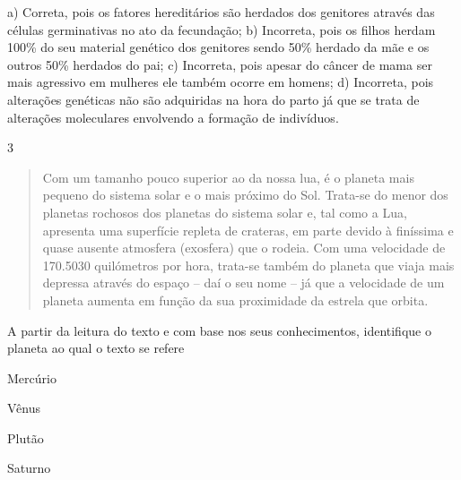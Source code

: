 {{{a)  Correta, pois os fatores hereditários são herdados dos genitores
  através das células germinativas no ato da fecundação;
b)  Incorreta, pois os filhos herdam 100\% do seu material genético dos
  genitores sendo 50\% herdado da mãe e os outros 50\% herdados do pai;
c)  Incorreta, pois apesar do câncer de mama ser mais agressivo em
  mulheres ele também ocorre em homens;
d)  Incorreta, pois alterações genéticas não são adquiridas na hora do
  parto já que se trata de alterações moleculares envolvendo a formação
  de indivíduos.}

\num{3}
\begin{quote}
  Com um tamanho pouco superior ao da nossa lua, é o planeta mais
  pequeno do sistema solar e o mais próximo do Sol. Trata-se do menor
  dos planetas rochosos dos planetas do sistema solar e, tal como a Lua,
  apresenta uma superfície repleta de crateras, em parte devido à
  finíssima e quase ausente atmosfera (exosfera) que o rodeia. Com uma
  velocidade de 170.5030 quilómetros por hora, trata-se também do
  planeta que viaja mais depressa através do espaço -- daí o seu nome --
  já que a velocidade de um planeta aumenta em função da sua proximidade
  da estrela que orbita.

\end{quote}

A partir da leitura do texto e com base nos seus conhecimentos,
identifique o planeta ao qual o texto se refere

\begin{escolha}
\item
  Mercúrio
\item
  Vênus
\item
  Plutão
\item
  Saturno
\end{escolha}


}}

